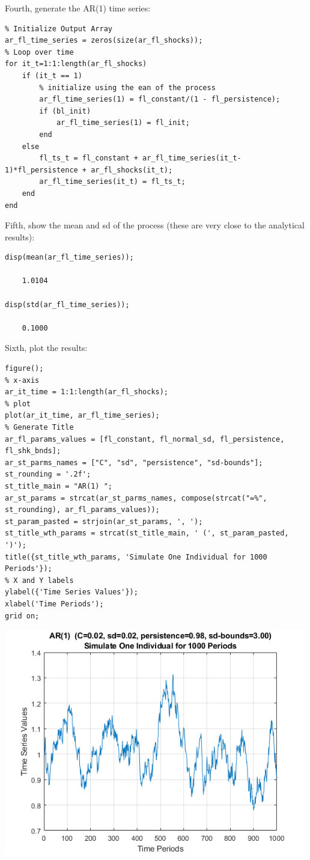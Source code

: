 \documentclass[
]{book}
\begin{document}
Fourth, generate the AR(1) time series:

\begin{verbatim}
% Initialize Output Array
ar_fl_time_series = zeros(size(ar_fl_shocks));
% Loop over time
for it_t=1:1:length(ar_fl_shocks)
    if (it_t == 1)
        % initialize using the ean of the process
        ar_fl_time_series(1) = fl_constant/(1 - fl_persistence);
        if (bl_init)
            ar_fl_time_series(1) = fl_init;            
        end
    else
        fl_ts_t = fl_constant + ar_fl_time_series(it_t-1)*fl_persistence + ar_fl_shocks(it_t);
        ar_fl_time_series(it_t) = fl_ts_t;
    end
end
\end{verbatim}

Fifth, show the mean and sd of the process (these are very close to the
analytical results):

\begin{verbatim}
disp(mean(ar_fl_time_series));

    1.0104

disp(std(ar_fl_time_series));

    0.1000
\end{verbatim}

Sixth, plot the results:

\begin{verbatim}
figure();
% x-axis
ar_it_time = 1:1:length(ar_fl_shocks);
% plot
plot(ar_it_time, ar_fl_time_series);
% Generate Title
ar_fl_params_values = [fl_constant, fl_normal_sd, fl_persistence, fl_shk_bnds];
ar_st_parms_names = ["C", "sd", "persistence", "sd-bounds"];
st_rounding = '.2f';
st_title_main = "AR(1) ";
ar_st_params = strcat(ar_st_parms_names, compose(strcat("=%", st_rounding), ar_fl_params_values));
st_param_pasted = strjoin(ar_st_params, ', ');
st_title_wth_params = strcat(st_title_main, ' (', st_param_pasted, ')');
title({st_title_wth_params, 'Simulate One Individual for 1000 Periods'});
% X and Y labels
ylabel({'Time Series Values'});
xlabel('Time Periods');
grid on;
\end{verbatim}

\includegraphics[width=5.20833in,height=\textheight]{img/fs_autoregressive_images/figure_0.png}
\end{document}
